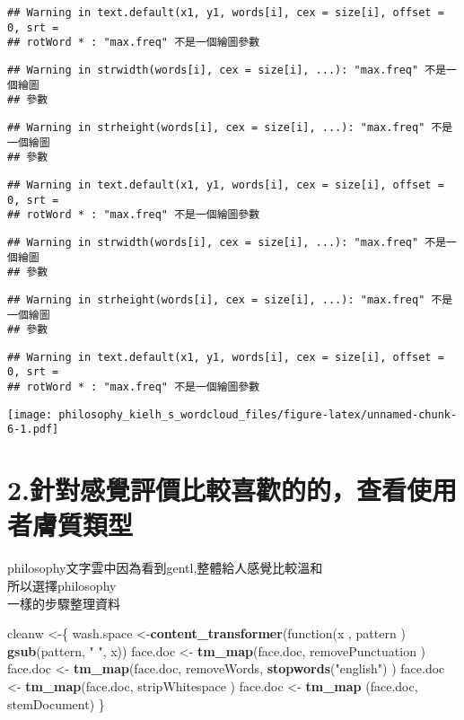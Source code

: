 \documentclass[]{article}
\newenvironment{Shaded}{\begin{snugshade}}{\end{snugshade}}
\newcommand{\KeywordTok}[1]{\textcolor[rgb]{0.13,0.29,0.53}{\textbf{{#1}}}}
\newcommand{\StringTok}[1]{\textcolor[rgb]{0.31,0.60,0.02}{{#1}}}
\newcommand{\NormalTok}[1]{{#1}}
\begin{document}
\begin{verbatim}
## Warning in text.default(x1, y1, words[i], cex = size[i], offset = 0, srt =
## rotWord * : "max.freq" 不是一個繪圖參數
\end{verbatim}

\begin{verbatim}
## Warning in strwidth(words[i], cex = size[i], ...): "max.freq" 不是一個繪圖
## 參數
\end{verbatim}

\begin{verbatim}
## Warning in strheight(words[i], cex = size[i], ...): "max.freq" 不是一個繪圖
## 參數
\end{verbatim}

\begin{verbatim}
## Warning in text.default(x1, y1, words[i], cex = size[i], offset = 0, srt =
## rotWord * : "max.freq" 不是一個繪圖參數
\end{verbatim}

\begin{verbatim}
## Warning in strwidth(words[i], cex = size[i], ...): "max.freq" 不是一個繪圖
## 參數
\end{verbatim}

\begin{verbatim}
## Warning in strheight(words[i], cex = size[i], ...): "max.freq" 不是一個繪圖
## 參數
\end{verbatim}

\begin{verbatim}
## Warning in text.default(x1, y1, words[i], cex = size[i], offset = 0, srt =
## rotWord * : "max.freq" 不是一個繪圖參數
\end{verbatim}

\texttt{[image: philosophy\_kielh\_s\_wordcloud\_files/figure-latex/unnamed-chunk-6-1.pdf]}

\section{2.針對感覺評價比較喜歡的的，查看使用者膚質類型}

philosophy文字雲中因為看到gentl,整體給人感覺比較溫和\\
所以選擇philosophy\\
一樣的步驟整理資料

\begin{Shaded}
\begin{Highlighting}[]
\NormalTok{cleanw <-\{}
\NormalTok{wash.space <-}\KeywordTok{content_transformer}\NormalTok{(function(x , pattern ) }\KeywordTok{gsub}\NormalTok{(pattern, }\StringTok{" "}\NormalTok{, x))}
\NormalTok{face.doc <-}\StringTok{ }\KeywordTok{tm_map}\NormalTok{(face.doc, removePunctuation )}
\NormalTok{face.doc <-}\StringTok{ }\KeywordTok{tm_map}\NormalTok{(face.doc, removeWords, }\KeywordTok{stopwords}\NormalTok{(}\StringTok{"english"}\NormalTok{) )}
\NormalTok{face.doc <-}\StringTok{ }\KeywordTok{tm_map}\NormalTok{(face.doc, stripWhitespace )}
\NormalTok{face.doc <-}\StringTok{ }\KeywordTok{tm_map} \NormalTok{(face.doc, stemDocument)}
\NormalTok{\}}
\end{Highlighting}
\end{Shaded}
\end{document}
